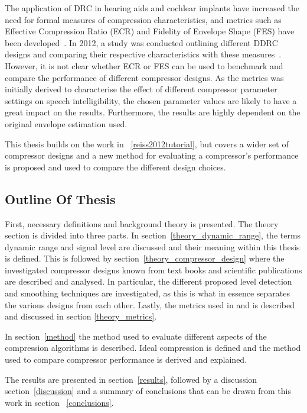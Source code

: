 \documentclass[../main2.tex]{subfiles}
\begin{document}
The application of DRC in hearing aids and cochlear implants have increased the need for formal measures of compression characteristics, and metrics such as Effective Compression Ratio (ECR) and Fidelity of Envelope Shape (FES) have been developed~\cite{stone1992syllabic}\cite{stone2007quantifying}. In 2012, a study was conducted outlining different DDRC designs and comparing their respective characteristics with these measures~\cite{reiss2012tutorial}. However, it is not clear whether ECR or FES can be used to benchmark and compare the performance of different compressor designs. As the metrics was initially derived to characterise the effect of different compressor parameter settings on speech intelligibility, the chosen parameter values are likely to have a great impact on the results. Furthermore, the results are highly dependent on the original envelope estimation used.

This thesis builds on the work in ~\ref{reiss2012tutorial}, but covers a wider set of compressor designs and a new method for evaluating a compressor's performance is proposed and used to compare the different design choices.

\subsection{Outline Of Thesis}
First, necessary definitions and background theory is presented. The theory section is divided into three parts. In section~\ref{theory_dynamic_range}, the terms dynamic range and signal level are discussed and their meaning within this thesis is defined. This is followed by section~\ref{theory_compressor_design} where the investigated compressor designs known from text books and scientific publications are described and analysed. In particular, the different proposed level detection and smoothing techniques are investigated, as this is what in essence separates the various designs from each other. Lastly, the metrics used in \cite{stone1992syllabic}\cite{stone2007quantifying} and \cite{reiss2012tutorial} is described and discussed in section \ref{theory_metrics}.

In section~\ref{method} the method used to evaluate different aspects of the compression algorithms is described. Ideal compression is defined and the method used to compare compressor performance is derived and explained.

The results are presented in section~\ref{results}, followed by a discussion section~\ref{discussion} and a summary of conclusions that can be drawn from this work in section ~\ref{conclusions}.
\end{document}
